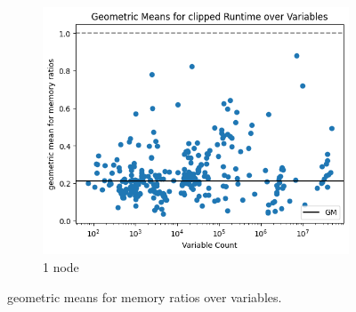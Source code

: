 \documentclass[12pt,a4paper,twoside]{scrartcl}
\numberwithin{equation}{section}
\begin{document}
\begin{figure}
\begin{subfigure}[c]{.4\textwidth}
    \center
    \includegraphics[scale=.3]{plots/16node_compare/mem_gm_over_vars.png}
    \caption{1 node}
  \end{subfigure}
  \caption{geometric means for memory ratios over variables.}
  \label{fig:memGmVars}
\end{figure}
\end{document}
